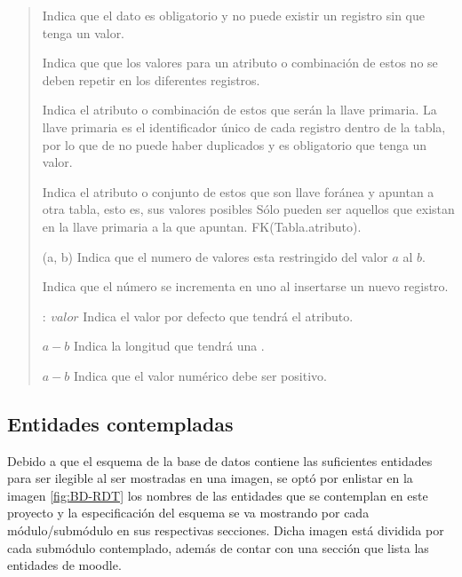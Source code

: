    \begin{quote}
    \begin{bGlosario}

            Indica que el dato es obligatorio y no puede existir un registro sin que tenga
            un valor.

            Indica que que los valores para un atributo o combinación de estos no se deben
            repetir en los diferentes registros.

            Indica el atributo o combinación de estos que serán la llave primaria. La llave
            primaria es el identificador único de cada registro dentro de la tabla, por lo
            que de no puede haber duplicados y es obligatorio que tenga un valor.

            Indica el atributo o conjunto de estos que son llave foránea y apuntan a otra
            tabla, esto es, sus valores posibles Sólo pueden ser aquellos que existan en la
            llave primaria a la que apuntan. FK(Tabla.atributo).

        (a, b)
            Indica que el numero de valores esta restringido del valor $a$ al $b$.

            Indica que el número se incrementa en uno al insertarse un nuevo registro.

         $:\ valor$
            Indica el valor por defecto que tendrá el atributo.

         $a-b$
            Indica la longitud que tendrá una .

         $a-b$
            Indica que el valor numérico debe ser positivo.
    \end{bGlosario}
    \end{quote}

\clearpage

\subsection{Entidades contempladas}

 Debido a que el esquema de la base de datos contiene las suficientes entidades para ser ilegible al ser mostradas en una imagen, se optó por
 enlistar en la imagen \ref{fig:BD-RDT} los nombres de las entidades que se contemplan en este proyecto y la especificación del esquema se va mostrando
 por cada módulo/submódulo en sus respectivas secciones. Dicha imagen está dividida
 por cada submódulo contemplado, además de contar con una sección que lista las entidades de moodle.\\


